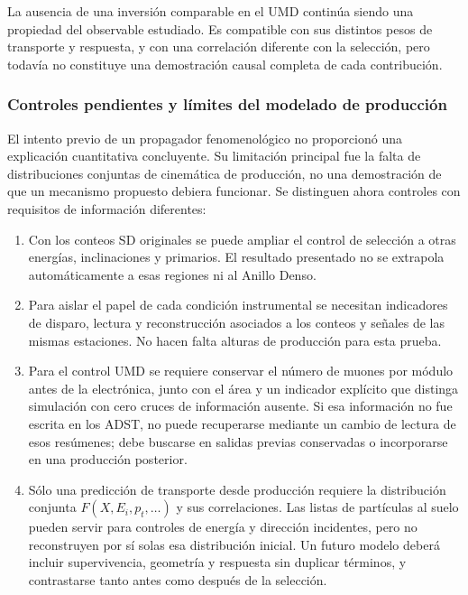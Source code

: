 La ausencia de una inversión comparable en el UMD continúa siendo una propiedad del observable estudiado. Es compatible con sus distintos pesos de transporte y respuesta, y con una correlación diferente con la selección, pero todavía no constituye una demostración causal completa de cada contribución.

\subsubsection{Controles pendientes y límites del modelado de producción}
\label{subsec:fast_mc}

El intento previo de un propagador fenomenológico no proporcionó una explicación cuantitativa concluyente. Su limitación principal fue la falta de distribuciones conjuntas de cinemática de producción, no una demostración de que un mecanismo propuesto debiera funcionar. Se distinguen ahora controles con requisitos de información diferentes:

\begin{enumerate}
\item Con los conteos SD originales se puede ampliar el control de selección a otras energías, inclinaciones y primarios. El resultado presentado no se extrapola automáticamente a esas regiones ni al Anillo Denso.
\item Para aislar el papel de cada condición instrumental se necesitan indicadores de disparo, lectura y reconstrucción asociados a los conteos y señales de las mismas estaciones. No hacen falta alturas de producción para esta prueba.
\item Para el control UMD se requiere conservar el número de muones por módulo antes de la electrónica, junto con el área y un indicador explícito que distinga simulación con cero cruces de información ausente. Si esa información no fue escrita en los ADST, no puede recuperarse mediante un cambio de lectura de esos resúmenes; debe buscarse en salidas previas conservadas o incorporarse en una producción posterior.
\item Sólo una predicción de transporte desde producción requiere la distribución conjunta $F(X,E_i,p_t,\ldots)$ y sus correlaciones. Las listas de partículas al suelo pueden servir para controles de energía y dirección incidentes, pero no reconstruyen por sí solas esa distribución inicial. Un futuro modelo deberá incluir supervivencia, geometría y respuesta sin duplicar términos, y contrastarse tanto antes como después de la selección.
\end{enumerate}

